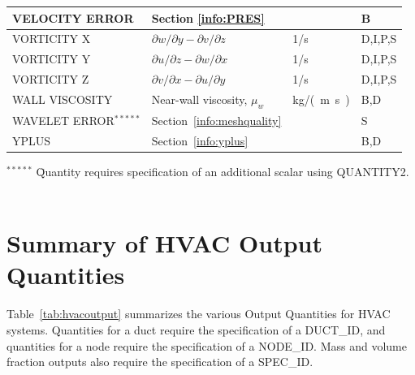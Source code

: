 \documentclass[11pt]{book}
\begin{document}
\begin{longtable}{@{\extracolsep{\fill}}|l|l|l|l|}
{\ct VELOCITY ERROR}                            & Section \ref{info:PRES}                           &                & B            \\ \hline
{\ct VORTICITY X}                               & $\partial w/\partial y - \partial v/\partial z$   & 1/s            & D,I,P,S      \\ \hline
{\ct VORTICITY Y}                               & $\partial u/\partial z - \partial w/\partial x$   & 1/s            & D,I,P,S      \\ \hline
{\ct VORTICITY Z}                               & $\partial v/\partial x - \partial u/\partial y$   & 1/s            & D,I,P,S      \\ \hline
{\ct WALL VISCOSITY}                            & Near-wall viscosity, $\mu_w$                      & \si{kg/(m.s)}  & B,D          \\ \hline
{\ct WAVELET ERROR}$^{*****}$                   & Section~\ref{info:meshquality}                    &                & S            \\ \hline
{\ct YPLUS}                                     & Section~\ref{info:yplus}                          &                & B,D          \\ \hline
\end{longtable}

\noindent
\begin{tabbing}
$^{*****}$ \hspace{0.25in} \=  Quantity requires specification of an additional scalar using {\ct QUANTITY2}. \
\end{tabbing}

\clearpage
\section{Summary of HVAC Output Quantities}
\label{info:hvacoutputquantities}

Table~\ref{tab:hvacoutput} summarizes the various Output Quantities for HVAC systems.  Quantities for a duct require the specification
of a {\ct DUCT\_ID}, and quantities for a node require the specification of a {\ct NODE\_ID}.  Mass and volume fraction outputs also require the specification of a {\ct SPEC\_ID}.
\end{document}
